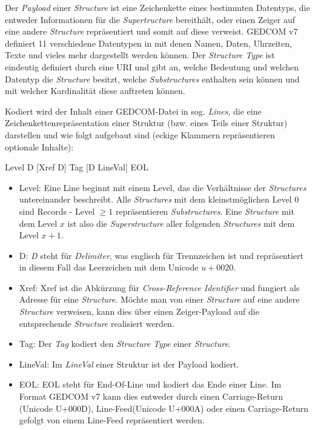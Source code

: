 Der \textit{Payload} einer \textit{Structure} ist eine Zeichenkette eines bestimmten Datentyps, die entweder Informationen für die \textit{Supertructure} bereithält, oder einen Zeiger auf eine andere \textit{Structure} repräsentiert und somit auf diese verweist. GEDCOM v7 definiert 11 verschiedene Datentypen in \cite{GEDCOM} mit denen Namen, Daten, Uhrzeiten, Texte und vieles mehr dargestellt werden können. Der \textit{Structure Type} ist eindeutig definiert durch eine URI und gibt an, welche Bedeutung und welchen Datentyp die \textit{Structure} besitzt, welche \textit{Substructures} enthalten sein können und mit welcher Kardinalität diese auftreten können. \cite{GEDCOM} 

Kodiert wird der Inhalt einer GEDCOM-Datei in sog. \textit{Lines}, die eine Zeichenkettenrepräsentation einer Struktur (bzw. eines Teils einer Struktur) darstellen und wie folgt aufgebaut sind (eckige Klammern repräsentieren optionale Inhalte):
\begin{center}
	Level  D  [Xref  D]  Tag  [D  LineVal]  EOL
\end{center}
\begin{itemize}
	\item Level: Eine Line beginnt mit einem Level, das die Verhältnisse der \textit{Structures} untereinander beschreibt. Alle \textit{Structures} mit dem kleinstmöglichen Level $0$ sind Records - Level $\ge1$ repräsentieren \textit{Substructures}. Eine \textit{Structure} mit dem Level $x$ ist also die \textit{Superstructure} aller folgenden \textit{Structures} mit dem Level $x+1$.
	\item D: \textit{D} steht für \textit{Delimiter}, was englisch für Trennzeichen ist und repräsentiert in diesem Fall das Leerzeichen mit dem Unicode $u+0020$.
	\item Xref: Xref ist die Abkürzung für \textit{Cross-Reference Identifier} und fungiert als Adresse für eine \textit{Structure}. Möchte man von einer \textit{Structure} auf eine andere \textit{Structure} verweisen, kann dies über einen Zeiger-Payload auf die entsprechende \textit{Structure} realisiert werden.
	\item Tag: Der \textit{Tag} kodiert den \textit{Structure Type} einer \textit{Structure}.
	\item LineVal: Im \textit{LineVal} einer Struktur ist der Payload kodiert.
	\item EOL: EOL steht für End-Of-Line und kodiert das Ende einer Line. Im Format GEDCOM v7 kann dies entweder durch einen Carriage-Return (Unicode U+000D), Line-Feed(Unicode U+000A) oder einen Carriage-Return gefolgt von einem Line-Feed repräsentiert werden.
\end{itemize}
